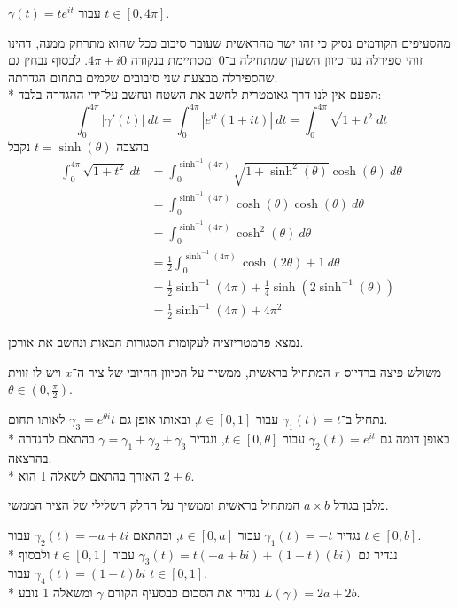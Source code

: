 \subquestion{}
$\gamma(t) = t e^{it}$ עבור $t \in [0, 4\pi]$.
\begin{solution}
	מהסעיפים הקודמים נסיק כי זהו ישר מהראשית שעובר סיבוב ככל שהוא מתרחק ממנה, דהינו זוהי ספירלה נגד כיוון השעון שמתחילה ב־$0$ ומסתיימת בנקודה $4\pi + i0$.
	לבסוף נבחין גם שהספירלה מבצעת שני סיבובים שלמים בתחום הגדרתה. \\*
	הפעם אין לנו דרך גאומטרית לחשב את השטח ונחשב על־ידי ההגדרה בלבד:
	\[
		\int_{0}^{4\pi} |\gamma'(t)|\ dt
		= \int_{0}^{4\pi} |e^{it} (1 + it)|\ dt
		= \int_0^{4\pi} \sqrt{1 + t^2}\ dt
	\]
	בהצבה $t = \sinh(\theta)$ נקבל
	\begin{align*}
		\int_0^{4\pi} \sqrt{1 + t^2}\ dt
		& = \int_0^{\sinh^{-1}(4\pi)} \sqrt{1 + \sinh^2(\theta)} \cosh(\theta)\ d\theta \\
		& = \int_0^{\sinh^{-1}(4\pi)} \cosh(\theta) \cosh(\theta)\ d\theta \\
		& = \int_0^{\sinh^{-1}(4\pi)} \cosh^2(\theta)\ d\theta \\
		& = \frac{1}{2} \int_0^{\sinh^{-1}(4\pi)} \cosh(2\theta) + 1\ d\theta \\
		& = \frac{1}{2} \sinh^{-1}(4\pi) + \frac{1}{4} \sinh(2 \sinh^{-1}(\theta)) \\
		& = \frac{1}{2} \sinh^{-1}(4\pi) + 4 \pi^2
	\end{align*}
\end{solution}

\question{}
נמצא פרמטריזציה לעקומות הסגורות הבאות ונחשב את אורכן.

\subquestion{}
משולש פיצה ברדיוס $r$ המתחיל בראשית, ממשיך על הכיוון החיובי של ציר ה־$x$ ויש לו זווית $\theta \in (0, \frac{\pi}{2})$.
\begin{solution}
	נתחיל ב־$\gamma_1(t) = t$ עבור $t \in [0, 1]$, ובאותו אופן גם $\gamma_3 = e^{\theta i} t$ לאותו תחום. \\*
	באופן דומה גם $\gamma_2(t) = e^{it}$ עבור $t \in [0, \theta]$, ונגדיר $\gamma = \gamma_1 + \gamma_2 + \gamma_3$ בהתאם להגדרה בהרצאה. \\*
	האורך בהתאם לשאלה 1 הוא $2 + \theta$.
\end{solution}

\subquestion{}
מלבן בגודל $a \times b$ המתחיל בראשית וממשיך על החלק השלילי של הציר הממשי.
\begin{solution}
	נגדיר $\gamma_1(t) = -t$ עבור $t \in [0, a]$, ובהתאם $\gamma_2(t) = -a + ti$ עבור $t \in [0, b]$. \\*
	נגדיר גם $\gamma_3(t) = t(-a + bi) + (1 - t)(bi)$ עבור $t \in [0, 1]$ ולבסוף $\gamma_4(t) = (1 - t) bi$ עבור $t \in [0, 1]$. \\*
	נגדיר את הסכום כבסעיף הקודם $\gamma$ ומשאלה 1 נובע $L(\gamma) = 2a + 2b$.
\end{solution}


